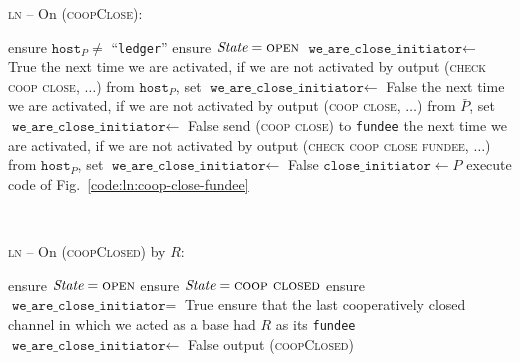\begin{center}
  \begin{processbox}{\textsc{ln} -- On (\textsc{coopClose}):}
    \begin{algorithmic}[1]
      \State ensure $\texttt{host}_P \neq$ ``\texttt{ledger}''
      \State ensure $\itistate = \textsc{open}$
      \State $\texttt{we\_are\_close\_initiator} \gets$ True
       
         
          \State the next time we are activated, if we are not activated by
          output (\textsc{check coop close}, $\dots$) from $\texttt{host}_P$,
          set $\texttt{we\_are\_close\_initiator} \gets$ False
        \Else \: 
          \State the next time we are activated, if we are not activated by
          output (\textsc{coop close}, $\dots$) from $\bar{P}$, set
          $\texttt{we\_are\_close\_initiator} \gets$ False
        \EndIf
        \State send (\textsc{coop close}) to \texttt{fundee}
      \Else \: 
        \State the next time we are activated, if we are not activated by output
        (\textsc{check coop close fundee}, $\dots$) from $\texttt{host}_P$, set
        $\texttt{we\_are\_close\_initiator} \gets$ False
        \State $\texttt{close\_initiator} \gets P$
        \State execute code of Fig.~\ref{code:ln:coop-close-fundee}
        \label{code:ln:coop-close:goto}
      \EndIf
    \end{algorithmic}
  \end{processbox}
  \label{code:ln:coop-close}
\end{center} \ \\

\begin{center}
  \begin{processbox}{\textsc{ln} -- On (\textsc{coopClosed}) by $R$:}
    \begin{algorithmic}[1]
       
        \State ensure $\itistate = \textsc{open}$
      \Else \: 
        \State ensure $\itistate = \textsc{coop closed}$
      \EndIf
      \State ensure $\texttt{we\_are\_close\_initiator} =$ True
      \State ensure that the last cooperatively closed channel in which we acted
      as a base had $R$ as its \texttt{fundee}
      \State $\texttt{we\_are\_close\_initiator} \gets$ False
      \State output (\textsc{coopClosed})
    \end{algorithmic}
  \end{processbox}
  \label{code:ln:coop-closed-to-initiator}
\end{center} \ \\


